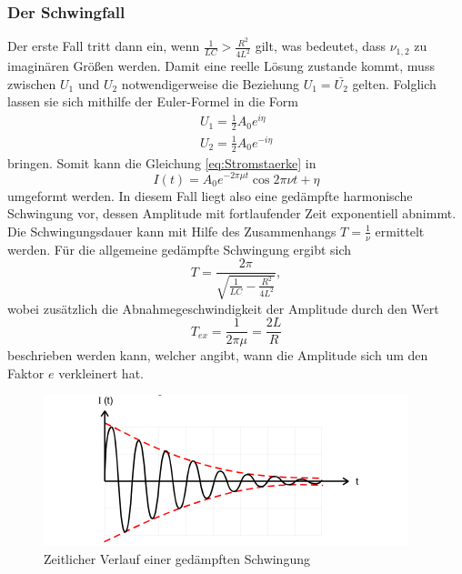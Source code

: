 \subsubsection{Der Schwingfall}
Der erste Fall tritt dann ein, wenn $\frac{1}{LC} > \frac{R^{2}}{4L^{2}}$ gilt, was bedeutet,
dass $\nu_{1,2}$ zu imaginären Größen werden. Damit eine reelle Lösung zustande kommt, muss
zwischen $U_1$ und $U_2$ notwendigerweise die Beziehung $U_1 = \bar{U_2}$ gelten. Folglich lassen 
sie sich mithilfe der Euler-Formel in die Form
\begin{align*}
    U_1 = \frac{1}{2} A_0 e^{i \eta} \\
    U_2 = \frac{1}{2} A_0 e^{-i \eta}
\end{align*}
\noindent bringen. Somit kann die Gleichung \ref{eq:Stromstaerke} in
\begin{equation*}
    I(t) = A_0 e^{-2\pi \mu t} \cos{2\pi \nu t + \eta}
\end{equation*}
\noindent umgeformt werden. In diesem Fall liegt also eine gedämpfte harmonische Schwingung vor, 
dessen Amplitude mit fortlaufender Zeit exponentiell abnimmt. Die Schwingungsdauer kann
mit Hilfe des Zusammenhangs $T = \frac{1}{\nu}$ ermittelt werden. Für die allgemeine 
gedämpfte Schwingung ergibt sich 
\begin{equation}
    T = \frac{2\pi}{\sqrt{\frac{1}{LC}-\frac{R^{2}}{4L^{2}}}}, 
\end{equation}
\noindent wobei zusätzlich die Abnahmegeschwindigkeit der Amplitude durch den Wert 
\begin{equation}
    T_{ex} = \frac{1}{2\pi\mu} = \frac{2L}{R}
\end{equation}
\noindent beschrieben werden kann, welcher angibt, wann die Amplitude sich um den Faktor $e$
verkleinert hat.

\begin{figure}[H]
  \centering
  \includegraphics{content/VerlaufGedaempfteSchwingung.png}
  \caption{Zeitlicher Verlauf einer gedämpften Schwingung}
  \label{fig:gsk}
\end{figure}


